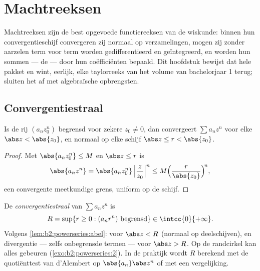 \chapter{Machtreeksen}\label{ch:b2:powerseries}

Machtreeksen zijn de best opgevoede functiereeksen van de
wiskunde: binnen hun convergentieschijf convergeren zij normaal op
 verzamelingen, mogen zij zonder aarzelen term voor term
worden gedifferentieerd en geïntegreerd, en worden hun sommen ---
de \emph{} ---  door hun coëfficiënten
bepaald. Dit hoofdstuk bewijst dat hele pakket en wint, eerlijk,
elke taylorreeks van het volume van bachelorjaar 1 terug;
 sluiten het af met algebraïsche opbrengsten.

\section{Convergentiestraal}

\begin{lemma}[Abel]\label{lem:b2:powerseries:abel}
Is de rij $(a_n z_0^n)$ begrensd voor zekere $z_0 \neq 0$, dan
convergeert $\sum a_n z^n$  voor elke $\abs z < \abs
{z_0}$, en normaal op elke schijf $\abs z \leq r < \abs{z_0}$.
\end{lemma}

\begin{proof}
Met $\abs{a_n z_0^n} \leq M$ en $\abs z \leq r$ is
\[
\abs{a_n z^n} = \abs{a_n z_0^n}\,\Bigl|\frac{z}{z_0}\Bigr|^n
\leq M\Bigl(\frac{r}{\abs{z_0}}\Bigr)^{\!n},
\]
een convergente meetkundige grens, uniform op de schijf.
\end{proof}

\begin{definition}[Convergentiestraal]\label{def:b2:powerseries:radius}
De \emph{convergentiestraal} van $\sum
a_n z^n$ is
\[
R = \sup\{r \geq 0 : (a_n r^n) \text{ begrensd}\} \in
\intcc{0}{+\infty} .
\]
Volgens \cref{lem:b2:powerseries:abel}:  voor
$\abs z < R$ (normaal op  deelschijven), en divergentie ---
zelfs onbegrensde termen --- voor $\abs z > R$. Op de randcirkel
kan alles gebeuren (\cref{exo:b2:powerseries:2}). In de praktijk
wordt $R$ berekend met de quotiënttest van d'Alembert op
$\abs{a_n}\abs z^n$ of met een vergelijking.
\end{definition}

